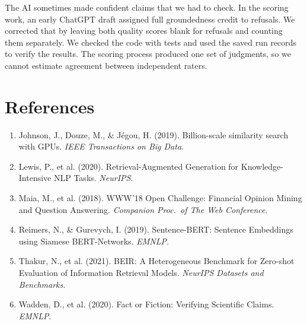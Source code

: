 \documentclass[11pt]{article}
\begin{document}
The AI sometimes made confident claims that we had to check. In the scoring work, an early ChatGPT draft assigned full groundedness credit to
refusals. We corrected that by leaving both quality scores blank for refusals and counting them separately. We
checked the code with tests and used the saved run records to verify the results. The scoring process produced one
set of judgments, so we cannot estimate agreement between independent raters.

\clearpage
\section*{References}
\begin{enumerate}[leftmargin=*]
\item Johnson, J., Douze, M., \& J\'egou, H. (2019). Billion-scale similarity search with GPUs. \emph{IEEE Transactions on Big Data}.
\item Lewis, P., et al. (2020). Retrieval-Augmented Generation for Knowledge-Intensive NLP Tasks. \emph{NeurIPS}.
\item Maia, M., et al. (2018). WWW'18 Open Challenge: Financial Opinion Mining and Question Answering. \emph{Companion Proc.\ of The Web Conference}.
\item Reimers, N., \& Gurevych, I. (2019). Sentence-BERT: Sentence Embeddings using Siamese BERT-Networks. \emph{EMNLP}.
\item Thakur, N., et al. (2021). BEIR: A Heterogeneous Benchmark for Zero-shot Evaluation of Information Retrieval Models. \emph{NeurIPS Datasets and Benchmarks}.
\item Wadden, D., et al. (2020). Fact or Fiction: Verifying Scientific Claims. \emph{EMNLP}.
\end{enumerate}
\end{document}
